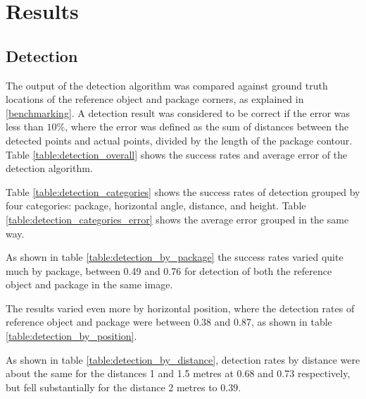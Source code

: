 \chapter{Results} \label{results}
%

\section{Detection} \label{results:detection}
The output of the detection algorithm was compared against ground truth locations of the reference object and package corners, as explained in \ref{benchmarking}.
A detection result was considered to be correct if the error was less than $10\%$, where the error was defined as the sum of distances between the detected points and actual points, divided by the length of the package contour. Table \ref{table:detection_overall} shows the success rates and average error of the detection algorithm.



Table \ref{table:detection_categories} shows the success rates of detection grouped by four categories: package, horizontal angle, distance, and height. Table \ref{table:detection_categories_error} shows the average error grouped in the same way.





As shown in table \ref{table:detection_by_package} the success rates varied quite much by package, between 0.49 and 0.76 for detection of both the reference object and package in the same image.


The results varied even more by horizontal position, where the detection rates of reference object and package were between 0.38 and 0.87, as shown in table \ref{table:detection_by_position}.


As shown in table \ref{table:detection_by_distance}, detection rates by distance were about the same for the distances 1 and 1.5 metres at 0.68 and 0.73 respectively, but fell substantially for the distance 2 metres to 0.39.


